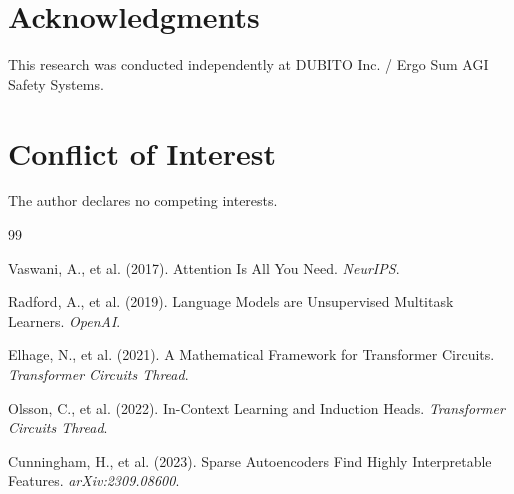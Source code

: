 \documentclass[12pt,a4paper]{article}
\begin{document}
\section*{Acknowledgments}

This research was conducted independently at DUBITO Inc. / Ergo Sum AGI Safety Systems.

\section*{Conflict of Interest}

The author declares no competing interests.


\begin{thebibliography}{99}

Vaswani, A., et al. (2017). Attention Is All You Need. \textit{NeurIPS}.

Radford, A., et al. (2019). Language Models are Unsupervised Multitask Learners. \textit{OpenAI}.

Elhage, N., et al. (2021). A Mathematical Framework for Transformer Circuits. \textit{Transformer Circuits Thread}.

Olsson, C., et al. (2022). In-Context Learning and Induction Heads. \textit{Transformer Circuits Thread}.

Cunningham, H., et al. (2023). Sparse Autoencoders Find Highly Interpretable Features. \textit{arXiv:2309.08600}.

\end{thebibliography}
\end{document}
